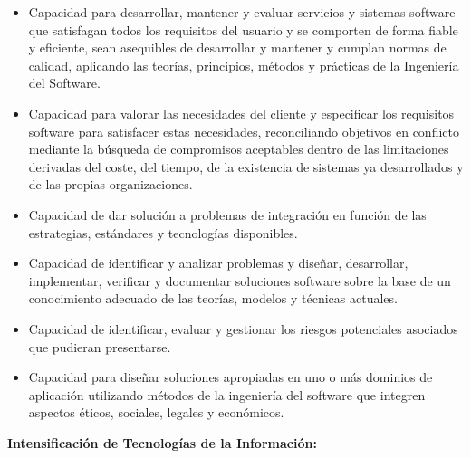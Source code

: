 \documentclass[a4paper]{article}
\newcommand\liststyleLix{%
\renewcommand\labelitemi{{\textbullet}}
\renewcommand\labelitemii{{\textbullet}}
\renewcommand\labelitemiii{{\textbullet}}
\renewcommand\labelitemiv{{\textbullet}}
}
\begin{document}
\liststyleLix
\begin{itemize}
\item Capacidad para desarrollar, mantener y evaluar servicios y sistemas software que satisfagan todos los requisitos
del usuario y se comporten de forma fiable y eficiente, sean asequibles de desarrollar y mantener y cumplan normas de
calidad, aplicando las teor\'ias, principios, m\'etodos y pr\'acticas de la Ingenier\'ia del Software.
\item Capacidad para valorar las necesidades del cliente y especificar los requisitos software para satisfacer estas
necesidades, reconciliando objetivos en conflicto mediante la b\'usqueda de compromisos aceptables dentro de las
limitaciones derivadas del coste, del tiempo, de la existencia de sistemas ya desarrollados y de las propias
organizaciones.
\item Capacidad de dar soluci\'on a problemas de integraci\'on en funci\'on de las estrategias, est\'andares y
tecnolog\'ias disponibles.
\item Capacidad de identificar y analizar problemas y dise\~nar, desarrollar, implementar, verificar y documentar
soluciones software sobre la base de un conocimiento adecuado de las teor\'ias, modelos y t\'ecnicas actuales.
\item Capacidad de identificar, evaluar y gestionar los riesgos potenciales asociados que pudieran presentarse.
\item Capacidad para dise\~nar soluciones apropiadas en uno o m\'as dominios de aplicaci\'on utilizando m\'etodos de la
ingenier\'ia del software que integren aspectos \'eticos, sociales, legales y econ\'omicos.
\end{itemize}
{\bfseries
Intensificaci\'on de Tecnolog\'ias de la Informaci\'on:}
\end{document}
